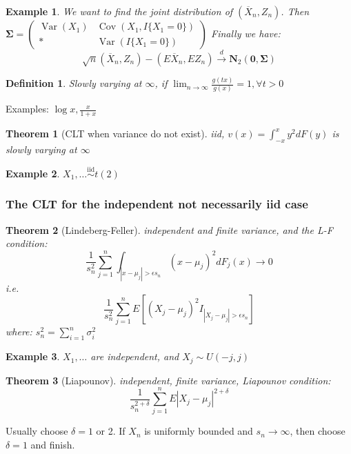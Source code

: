 \documentclass{ctexart}
\newtheorem{theorem}{Theorem}[subsection]
\newtheorem{definition}{Definition}[subsection]
\newtheorem{example}{Example}[subsection]
\begin{document}
\begin{example}
  We want to find the joint distribution of \((\overline{X}_n,Z_n)\). Then \(\boldsymbol{\Sigma}=\begin{pmatrix}
    \operatorname{Var}(X_1) & \operatorname{Cov}(X_1,I\{X_1=0\})\\
    * & \operatorname{Var}(I\{X_1=0\})
  \end{pmatrix}\)  
  Finally we have: 
  \[
  \sqrt{n}(\overline{X}_n,Z_n)-(E \overline{X}_n,EZ_n)\xrightarrow{d}\boldsymbol{N}_2(\boldsymbol{0},\boldsymbol{\Sigma})
  \] 
\end{example}

\begin{definition}
  Slowly varying at \(\infty\), if \(\lim_{n \to \infty}\frac{g(tx)}{g(x)}=1,\forall t>0\)  
\end{definition}
Examples: \(\log x,\frac{x}{1+x}\)

\begin{theorem}[CLT when variance do not exist]
  iid, \(v(x)=\int_{-x}^x y^2 dF(y)\) is slowly varying at \(\infty\)  
\end{theorem}

\begin{example}
  \(X_1,\ldots \overset{\text{iid}}{\sim}t(2)\) 
\end{example}

\subsubsection{The CLT for the independent not necessarily iid case}
\begin{theorem}[Lindeberg-Feller] 
  independent and finite variance, and the L-F condition: 
  \[
  \frac{1}{s_n^2}\sum_{j=1}^{n} \int_{|x-\mu_j|>\epsilon s_n}(x-\mu_j)^2 dF_j(x)\to 0
  \] 
  i.e.
  \[
  \frac{1}{s_n^2}\sum_{j=1}^{n} E[(X_j-\mu_j)^2 I_{|X_j-\mu_j|>\epsilon s_n}]
  \] 
  where: \(s_n^2=\sum_{i=1}^{n} \sigma_i^2\) 
\end{theorem}
\begin{example}
\(X_1,\ldots\) are independent, and \(X_j\sim U(-j,j)\) 
\end{example}
\begin{theorem}[Liapounov]
  independent, finite variance, Liapounov condition: 
  \[
  \frac{1}{s_n^{2+\delta}}\sum_{j=1}^{n} E|X_j-\mu_j|^{2+\delta} 
  \]  
\end{theorem}
Usually choose \(\delta=1\) or 2. If \(X_{n}\) is uniformly bounded and \(s_{n}\to \infty\), then choose \(\delta=1\) and finish.  
\end{document}
